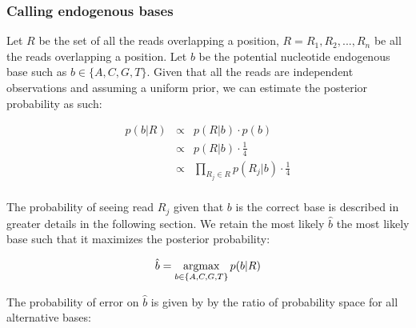 \documentclass[a4paper,12pt]{article}
\newcommand{\argmax}{\operatornamewithlimits{argmax}}
\begin{document}





































\subsubsection{Calling endogenous bases}
\label{sec:callingendobase}

\noindent Let $R$ be the set of all the reads overlapping a position, $R={R_1,R_2,...,R_n}$ be all the reads overlapping a position.  Let $b$ be the potential nucleotide endogenous base such as $b\in\{A,C,G,T\}$. Given that all the reads are independent observations and assuming a uniform prior, we can estimate the posterior probability as such:

\begin{eqnarray}
  p(b|R)   & \propto & p(R|b) \cdot p(b)  \\
  & \propto & p(R|b) \cdot \frac {1} {4} \\
  & \propto & \prod_{R_j \in R} p(R_j|b) \cdot \frac {1} {4} \\
\label{eqn:idenp}
\end{eqnarray} 


\noindent The probability of seeing read $R_j$ given that $b$ is the correct base is described in greater details in the following section.  We retain the most likely $\hat{b}$ the most likely base such that it maximizes the posterior probability:

\begin{equation}
\hat{b} = \argmax_{b \in \{A,C,G,T\} }   p(b|R)
\end{equation} 


\noindent  The probability of error on $\hat{b}$ is given by by the ratio of probability space for all alternative bases:
\end{document}
